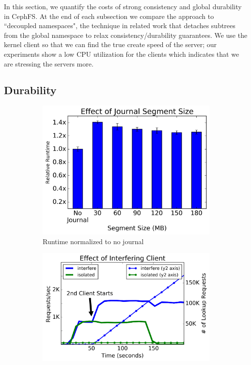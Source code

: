 In this section, we quantify the costs of strong consistency and global
durability in CephFS. At the end of each subsection we compare the approach to
``decoupled namespaces", the technique in related work that detaches subtrees
from the global namespace to relax consistency/durability guarantees.  We use
the kernel client so that we can find the true create speed of the server; our
experiments show a low CPU utilization for the clients which indicates that we
are stressing the servers more.

\subsection{Durability}
\label{sec:durability}

\begin{figure}[t]
  \centering
  \begin{subfigure}[b]{.3\linewidth}
      \centering
      \includegraphics[width=1.0\linewidth]{graphs/slowdown-journal.png}
      \caption{Runtime normalized to no journal} \label{fig:overhead-a}
  \end{subfigure}
  \begin{subfigure}[b]{.3\linewidth}
      \centering
      \includegraphics[width=1.2\linewidth]{graphs/behavior-interfere.png}

\end{subfigure}
\end{figure}
